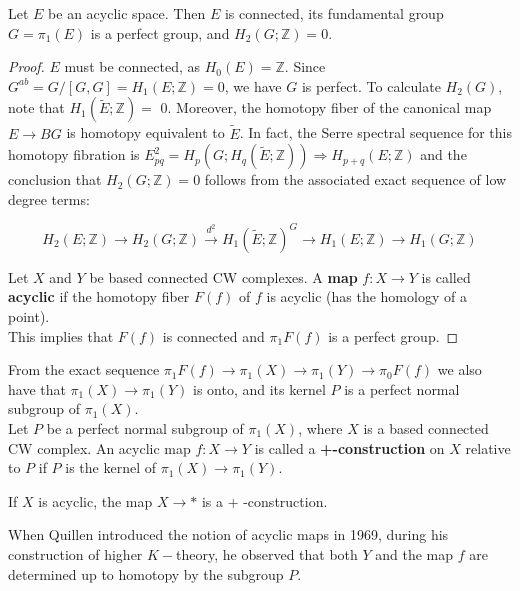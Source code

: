 \begin{lemm}
    Let $E$ be an acyclic space. Then $E$ is connected, its fundamental group $G=\pi_1(E)$ is a perfect group, and $H_2(G ; \mathbb{Z})=0$.
\end{lemm}
\begin{proof}
    
$E$ must be connected, as $H_0(E)=\mathbb{Z}$. Since $G^{ab} =G /[G, G]=H_1(E ; \mathbb{Z})=0$, we have $G$ is perfect. To calculate $H_2(G)$, note that $H_1(\tilde{E} ; \mathbb{Z})=$ 0. Moreover, the homotopy fiber of the canonical map $E \rightarrow B G$ is homotopy equivalent to $\tilde{E}$. In fact, the Serre spectral sequence for this homotopy fibration is $E_{p q}^2=H_p\left(G ; H_q(\tilde{E} ; \mathbb{Z})\right) \Rightarrow H_{p+q}(E ; \mathbb{Z})$ and the conclusion that $H_2(G ; \mathbb{Z})=0$ follows from the associated exact sequence of low degree terms:

$$
H_2(E ; \mathbb{Z}) \rightarrow H_2(G ; \mathbb{Z}) \xrightarrow{d^2} H_1(\tilde{E} ; \mathbb{Z})^G \rightarrow H_1(E ; \mathbb{Z}) \rightarrow H_1(G ; \mathbb{Z})
$$



Let $X$ and $Y$ be based connected CW complexes. A \textbf{map} $f: X \rightarrow Y$ is called \textbf{acyclic} if the homotopy fiber $F(f)$ of $f$ is acyclic (has the homology of a point).\\
This implies that $F(f)$ is connected and $\pi_1 F(f)$ is a perfect group.
\end{proof}

From the exact sequence $\pi_1 F(f) \rightarrow \pi_1(X) \rightarrow \pi_1(Y) \rightarrow \pi_0 F(f)$ we also have that $\pi_1(X) \rightarrow \pi_1(Y)$ is onto, and its kernel $P$ is a perfect normal subgroup of $\pi_1(X)$.\\

Let $P$ be a perfect normal subgroup of $\pi_1(X)$, where $X$ is a based connected CW complex. An acyclic map $f: X \rightarrow Y$ is called a \textbf{+-construction} on $X$ relative to $P$ if $P$ is the kernel of $\pi_1(X) \rightarrow \pi_1(Y)$.
\begin{lemm}
 If $X$ is acyclic, the map $X \rightarrow *$ is a + -construction.   
\end{lemm}

When Quillen introduced the notion of acyclic maps in 1969, during his construction of higher $K-$theory, he observed that both $Y$ and the map $f$ are determined up to homotopy by the subgroup $P$.

